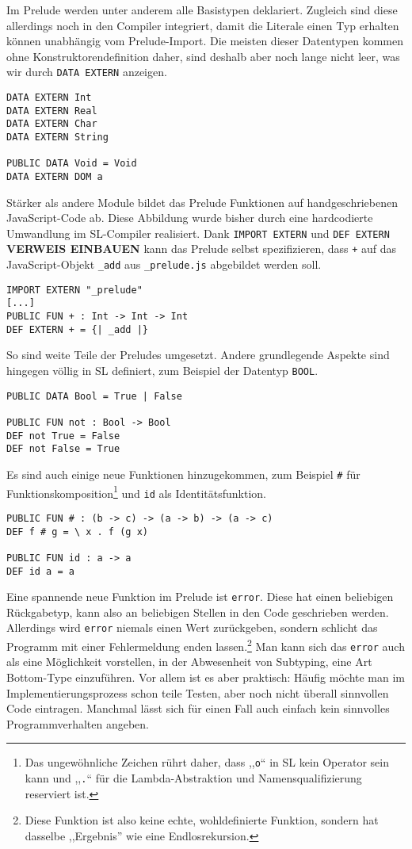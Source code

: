 \documentclass{llncs}
\begin{document}
Im Prelude werden unter anderem alle Basistypen deklariert. Zugleich sind
diese allerdings noch in den Compiler integriert, damit die Literale einen
Typ erhalten können unabhängig vom Prelude-Import. Die meisten dieser
Datentypen kommen ohne Konstruktorendefinition daher, sind deshalb aber noch
lange nicht leer, was wir durch \verb|DATA EXTERN| anzeigen.

\begin{verbatim}
DATA EXTERN Int
DATA EXTERN Real
DATA EXTERN Char
DATA EXTERN String

PUBLIC DATA Void = Void
DATA EXTERN DOM a
\end{verbatim}

Stärker als andere Module bildet das Prelude Funktionen auf handgeschriebenen
JavaScript-Code ab. Diese Abbildung wurde bisher durch eine hardcodierte
Umwandlung im SL-Compiler realisiert. Dank \verb|IMPORT EXTERN| und
\verb|DEF EXTERN| \textbf{VERWEIS EINBAUEN} kann das Prelude selbst
spezifizieren, dass \verb|+| auf das JavaScript-Objekt \verb|_add|
aus \verb|_prelude.js| abgebildet werden soll.

\begin{verbatim}
IMPORT EXTERN "_prelude" 
[...]
PUBLIC FUN + : Int -> Int -> Int
DEF EXTERN + = {| _add |}
\end{verbatim}

So sind weite Teile der Preludes umgesetzt. Andere grundlegende Aspekte
sind hingegen völlig in SL definiert, zum Beispiel der Datentyp \verb|BOOL|.

\begin{verbatim}
PUBLIC DATA Bool = True | False

PUBLIC FUN not : Bool -> Bool
DEF not True = False
DEF not False = True
\end{verbatim}

Es sind auch einige neue Funktionen hinzugekommen, zum Beispiel \verb|#|
für Funktionskomposition\footnote{Das ungewöhnliche Zeichen rührt daher,
dass ,,\texttt{o}`` in SL kein Operator sein kann und ,,\texttt{.}`` für die
Lambda-Abstraktion und Namensqualifizierung reserviert ist.} und
\verb|id| als Identitätsfunktion.

\begin{verbatim}
PUBLIC FUN # : (b -> c) -> (a -> b) -> (a -> c)
DEF f # g = \ x . f (g x)

PUBLIC FUN id : a -> a
DEF id a = a
\end{verbatim}

Eine spannende neue Funktion im Prelude ist \verb|error|. Diese hat einen
beliebigen Rückgabetyp, kann also an beliebigen Stellen in den Code
geschrieben werden. Allerdings wird \verb|error| niemals einen Wert
zurückgeben, sondern schlicht das Programm mit einer Fehlermeldung enden
lassen.\footnote{Diese Funktion ist also keine echte, wohldefinierte Funktion,
sondern hat dasselbe ,,Ergebnis'' wie eine Endlosrekursion.} Man kann sich
das \verb|error| auch als eine Möglichkeit vorstellen, in der Abwesenheit von
Subtyping, eine Art Bottom-Type einzuführen. Vor allem ist es aber praktisch:
Häufig möchte man im Implementierungsprozess schon teile Testen, aber noch
nicht überall sinnvollen Code eintragen. Manchmal lässt sich für einen
Fall auch einfach kein sinnvolles Programmverhalten angeben.
\end{document}
